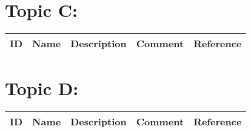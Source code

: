 \section{Topic C:}

\begin{table}[H]\centering
\begin{tabular}{p{1cm}p{2cm}p{3cm}p{3cm}p{1cm}}
ID & Name & Description & Comment & Reference \\
\hline
\hline
\end{tabular}
\end{table}

\section{Topic D:}

\begin{table}[H]\centering
\begin{tabular}{p{1cm}p{2cm}p{3cm}p{3cm}p{1cm}}
ID & Name & Description & Comment & Reference \\
\hline
\hline
\end{tabular}
\end{table}
